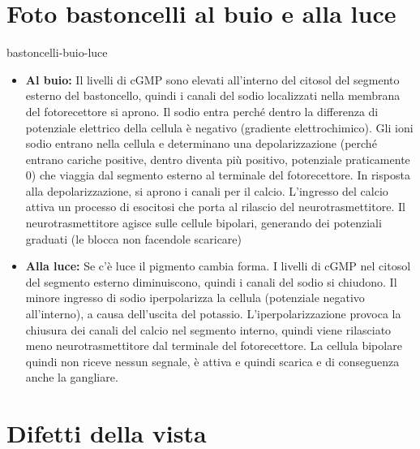 \documentclass[preview]{standalone}
\begin{document}

\section{Foto bastoncelli al buio e alla luce}

\begin{snippet}{bastoncelli-buio-luce}
    \begin{itemize}
        \item \textbf{Al buio:}
            Il livelli di cGMP sono elevati all'interno del citosol del segmento esterno
            del bastoncello, quindi i canali del sodio localizzati nella membrana del fotorecettore
            si aprono. Il sodio entra perché dentro la differenza di potenziale
            elettrico della cellula è negativo (gradiente elettrochimico).
            Gli ioni sodio entrano nella cellula e determinano una depolarizzazione
            (perché entrano cariche positive, dentro diventa più positivo, potenziale praticamente 0) che viaggia
            dal segmento esterno al terminale del fotorecettore. 
            In risposta alla depolarizzazione, si aprono i canali per il calcio.
            L'ingresso del calcio attiva un processo di esocitosi che porta al rilascio del neurotrasmettitore.
            Il neurotrasmettitore agisce sulle cellule bipolari, generando dei potenziali graduati (le blocca non facendole scaricare)
        \item \textbf{Alla luce:}
            Se c'è luce il pigmento cambia forma. I livelli di cGMP nel citosol del segmento esterno diminuiscono, quindi i canali del sodio si chiudono.
            Il minore ingresso di sodio iperpolarizza la cellula (potenziale negativo all'interno),
            a causa dell'uscita del potassio.
            L'iperpolarizzazione provoca la chiusura dei canali del calcio nel segmento interno,
            quindi viene rilasciato meno neurotrasmettitore dal terminale del fotorecettore.
            La cellula bipolare quindi non riceve nessun segnale, è attiva e quindi scarica
            e di conseguenza anche la gangliare.
    \end{itemize}
\end{snippet}

\section{Difetti della vista}
\end{document}
